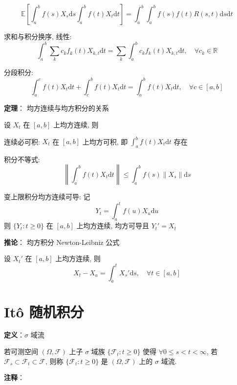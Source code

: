 \documentclass[openany]{ctexbook}
\theoremstyle{kaiti}
\theoremstyle{normal}
\begin{document}
\begin{equation}
  \mathbb{E}\left[\int_a^bf(s)X_s\mathrm{d}s\int_a^bf(t)X_t\mathrm{d}t\right]=\int_a^b\int_a^bf(s)f(t)R(s,t)\mathrm{d}s\mathrm{d}t
\end{equation}

求和与积分换序, 线性:
\begin{equation}
  \int_a^b\sum_kc_kf_k(t)X_{k,t}\mathrm{d}t=\sum_k\int_a^bc_kf_k(t)X_{k,t}\mathrm{d}t,\quad\forall c_k\in\mathbb{R}
\end{equation}

分段积分:
\begin{equation}
  \int_a^cf(t)X_t\mathrm{d}t+\int_c^bf(t)X_t\mathrm{d}t=\int_a^bf(t)X_t\mathrm{d}t,\quad\forall c\in[a,b]
\end{equation}

\textbf{定理}： 均方连续与均方积分的关系

设 $X_t$ 在 $[a,b]$ 上均方连续, 则

连续必可积: $X_t$ 在 $[a,b]$ 上均方可积, 即 $\displaystyle\int_a^bf(t)X_t\mathrm{d}t$ 存在

积分不等式:
\begin{equation}
  \left\|\int_a^bf(t)X_t\mathrm{d}t\right\|\leqslant\int_a^bf(s)\|X_s\|\mathrm{d}s
\end{equation}

变上限积分均方连续可导: 记
\begin{equation}
  Y_t=\int_a^tf(u)X_u\mathrm{d}u
\end{equation}
则 $\{Y_t:t\geqslant0\}$ 在 $[a,b]$ 上均方连续, 均方可导且 $Y_t'=X_t$

\textbf{推论}： 均方积分 Newton-Leibniz 公式

设 $X_t'$ 在 $[a,b]$ 上均方连续, 则
\begin{equation}
  X_t-X_a=\int_a^tX_s'\mathrm{d}s,\quad\forall t\in[a,b]
\end{equation}

\section{It\^o 随机积分}

\textbf{定义}：$\sigma$ 域流

若可测空间 $(\Omega,\mathcal{F})$ 上子 $\sigma$ 域族 $\{\mathcal{F}_t:t\geqslant0\}$ 使得 $\forall0\leqslant s<t<\infty$, 若 $\mathcal{F}_s\subset\mathcal{F}_t\subset\mathcal{F}$, 则称 $\{\mathcal{F}_t:t\geqslant0\}$ 是 $(\Omega,\mathcal{F})$ 上的 $\sigma$ 域流.

\textbf{注释}：
\end{document}
